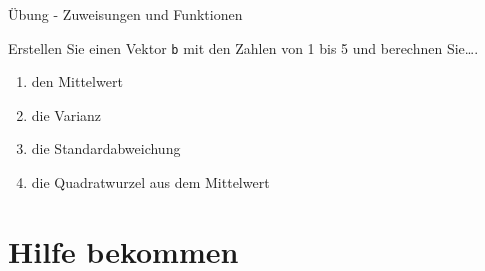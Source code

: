 \documentclass[ignorenonframetext,]{beamer}
\begin{document}
\begin{frame}[fragile]{Übung - Zuweisungen und Funktionen}
\protect\hypertarget{ubung---zuweisungen-und-funktionen}{}

Erstellen Sie einen Vektor \texttt{b} mit den Zahlen von 1 bis 5 und
berechnen Sie\ldots{}.

\begin{enumerate}
\item
  den Mittelwert
\item
  die Varianz
\item
  die Standardabweichung
\item
  die Quadratwurzel aus dem Mittelwert
\end{enumerate}

\end{frame}

\hypertarget{hilfe-bekommen}{%
\section{Hilfe bekommen}\label{hilfe-bekommen}}
\end{document}
